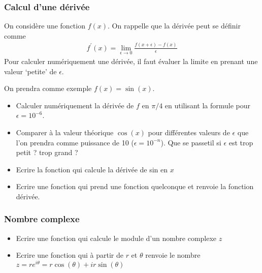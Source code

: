 \documentclass[letterpaper,10pt,english]{sphinxhowto}
\begin{document}
\subsubsection{Calcul d’une dérivée}
\label{\detokenize{cours2_nombres_exercices:calcul-d-une-derivee}}
\sphinxAtStartPar
On considère une fonction \(f(x)\). On rappelle que la dérivée peut se définir comme
\begin{equation*}
\begin{split}
f^\prime(x) = \lim_{\epsilon\rightarrow0}\frac{f(x+\epsilon) - f(x)}{\epsilon}
\end{split}
\end{equation*}
\sphinxAtStartPar
Pour calculer numériquement une dérivée, il faut évaluer la limite en prenant une valeur ‘petite’ de \(\epsilon\).

\sphinxAtStartPar
On prendra comme exemple \(f(x) = \sin(x)\).
\begin{itemize}
\item {} 
\sphinxAtStartPar
Calculer numériquement la dérivée de \(f\) en \(\pi/4\) en utilisant la formule pour \(\epsilon = 10^{-6}\).

\item {} 
\sphinxAtStartPar
Comparer à la valeur théorique \(\cos(x)\) pour différentes valeurs de \(\epsilon\) que l’on prendra comme puissance de 10 (\(\epsilon = 10^{-n}\)). Que se passe\sphinxhyphen{}t\sphinxhyphen{}il si \(\epsilon\) est trop petit ? trop grand ?

\item {} 
\sphinxAtStartPar
Ecrire la fonction  qui calcule la dérivée de sin en \(x\)

\item {} 
\sphinxAtStartPar
Ecrire une fonction qui prend une fonction quelconque et renvoie la fonction dérivée.

\end{itemize}


\subsubsection{Nombre complexe}
\label{\detokenize{cours2_nombres_exercices:nombre-complexe}}\begin{itemize}
\item {} 
\sphinxAtStartPar
Ecrire une fonction qui calcule le module d’un nombre complexe \(z\)

\item {} 
\sphinxAtStartPar
Ecrire une fonction qui à partir de \(r\) et \(\theta\) renvoie le nombre \(z = re^{i\theta} = r\cos(\theta) + ir\sin(\theta)\)

\end{itemize}
\end{document}
